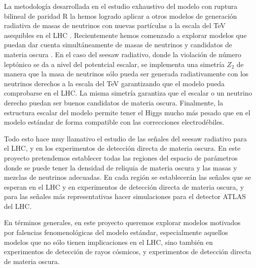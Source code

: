 \begin{darkmatter}
  La metodología desarrollada en el estudio exhaustivo del modelo con
  ruptura bilineal de paridad R la hemos logrado aplicar a otros
  modelos de generación radiativa de masas de neutrinos con nuevas
  partículas a la escala del TeV asequibles en el LHC
  \cite{Sierra:2008wj,AristizabalSierra:2006ri}. Recientemente hemos
  comenzado a explorar modelos que puedan dar cuenta simultáneamente
  de masas de neutrinos y candidatos de materia oscura
  \cite{Hirsch:2005ag,Choi:2010jt,Sierra:2008wj}. En el caso del
  seesaw radiativo, donde la violación de número leptónico se da a
  nivel del potentcial escalar, se implementa una simetría $Z_2$ de
  manera que la masa de neutrinos sólo pueda ser generada
  radiativamente con los neutrinos derechos a la escala del TeV
  garantizando que el modelo pueda comprobarse en el LHC. La misma
  simetría garantiza que el escalar o un neutrino derecho puedan ser
  buenos candidatos de materia oscura. Finalmente, la estructura
  escalar del modelo permite tener el Higgs mucho más pesado que en el
  modelo estándar de forma compatible con las correcciones
  electrodébiles.


\begin{proyecto}
  Todo esto hace muy llamativo el estudio de las señales del seesaw
  radiativo para el LHC, y en los experimentos de detección directa de
  materia oscura. En este proyecto pretendemos establecer todas las
  regiones del espacio de parámetros donde se puede tener la densidad
  de reliquia de materia oscura y las masas y mezclas de neutrinos
  adecuadas. En cada región se establecerán las señales que se esperan
  en el LHC y en experimentos de detección directa de materia oscura,
  y para las señales más representativas hacer simulaciones para el
  detector ATLAS del LHC.
\end{proyecto}
\end{darkmatter}


\begin{proyecto}
  En términos generales, en este proyecto queremos explorar modelos
  motivados por falencias fenomenológicas del modelo estándar,
  especialmente aquellos modelos que no sólo tienen implicaciones en
  el LHC, sino también en experimentos de detección de rayos cósmicos,
  y experimentos de detección directa de materia oscura.
\end{proyecto}


